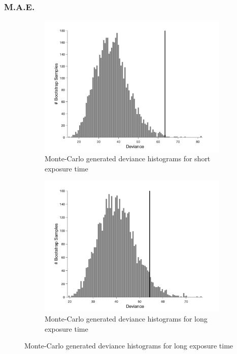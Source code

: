 \documentclass{article}
\begin{document}
\subsubsection*{M.A.E.}
\begin{figure}[!hb]
    \begin{subfigure}{0.494\textwidth}
        \centering
        \includegraphics[width = \linewidth]{Thesis/plots/gof/segDist/segDist_mae_short_bootstrap.png}
        \caption{Monte-Carlo generated deviance histograms for short exposure time}
        \label{fig:da_gof_short_bootstrap}
    \end{subfigure}
    \hspace{0.01\textwidth}
    \begin{subfigure}{0.494\textwidth}
        \centering
        \includegraphics[width = \linewidth]{Thesis/plots/gof/segDist/segDist_mae_long_bootstrap.png}
        \caption{Monte-Carlo generated deviance histograms for long exposure time}
        \label{fig:da_gof_long_bootstrap}
    \end{subfigure}
    

\end{figure}
\end{document}
